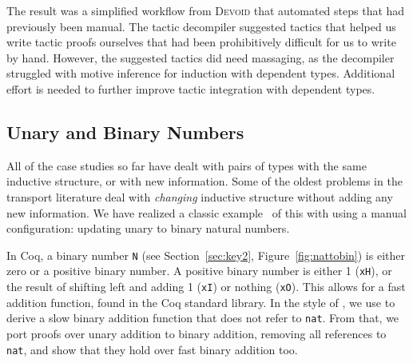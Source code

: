 
The result was a simplified workflow from \textsc{Devoid} that automated steps 
that had previously been manual.
The tactic decompiler suggested tactics that helped us write tactic proofs ourselves that had been
prohibitively difficult for us to write by hand.
However, the suggested tactics did need massaging, as the decompiler struggled with motive inference
for induction with dependent types.
Additional effort is needed to further improve tactic integration with dependent types.

\subsection{Unary and Binary Numbers}
\label{sec:bin}

All of the case studies so far have dealt with pairs of types with the same inductive structure,
or with new information.
Some of the oldest problems in the transport literature deal with \textit{changing} inductive
structure without adding any new information.
We have realized a classic example~\cite{magaud2000changing} of this with \toolname using a manual configuration:
updating unary to binary natural numbers.

In Coq, a binary number \lstinline{N} (see Section~\ref{sec:key2}, Figure~\ref{fig:nattobin}) is either zero or a positive binary number. A positive binary number
is either 1 (\lstinline{xH}), or the result of shifting left and adding 1 (\lstinline{xI})
or nothing (\lstinline{xO}).
This allows for a fast addition function, found in the Coq standard library.
In the style of \citet{magaud2000changing}, we use \toolname to derive a slow binary
addition function that does not refer to \lstinline{nat}.
From that, we port proofs over unary addition to binary addition,
removing all references to \lstinline{nat}, and show that they hold over fast binary addition too.

